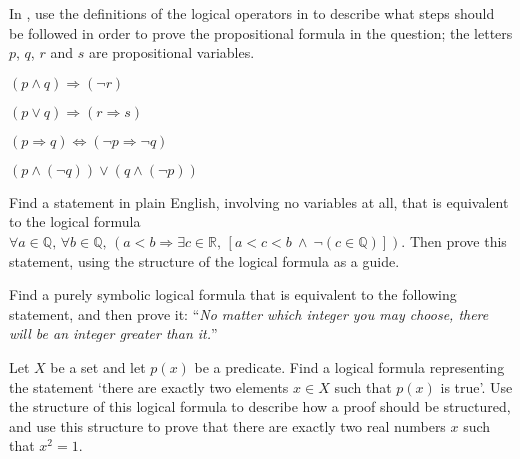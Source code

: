 In , use the definitions of the logical operators in  to describe what steps should be followed in order to prove the propositional formula in the question; the letters $p$, $q$, $r$ and $s$ are propositional variables.

\begin{chapex}
\label{cqStructureProofBegin}
$(p \wedge q) \Rightarrow (\neg r)$
\end{chapex}

\begin{chapex}
$(p \vee q) \Rightarrow (r \Rightarrow s)$
\end{chapex}

\begin{chapex}
$(p \Rightarrow q) \Leftrightarrow (\neg p \Rightarrow \neg q)$
\end{chapex}

\begin{chapex}
\label{cqStructureProofEnd}
$(p \wedge (\neg q)) \vee (q \wedge (\neg p))$
\end{chapex}


\begin{chapex}
Find a statement in plain English, involving no variables at all, that is equivalent to the logical formula $\forall a \in \mathbb{Q},\, \forall b \in \mathbb{Q},\, (a < b \Rightarrow \exists c \in \mathbb{R},\, [a < c < b ~\wedge~ \neg (c \in \mathbb{Q})])$. Then prove this statement, using the structure of the logical formula as a guide.
\end{chapex}

\begin{chapex}
Find a purely symbolic logical formula that is equivalent to the following statement, and then prove it: ``\textit{No matter which integer you may choose, there will be an integer greater than it.}''
\end{chapex}

\begin{chapex}
Let $X$ be a set and let $p(x)$ be a predicate. Find a logical formula representing the statement `there are exactly two elements $x \in X$ such that $p(x)$ is true'. Use the structure of this logical formula to describe how a proof should be structured, and use this structure to prove that there are exactly two real numbers $x$ such that $x^2=1$.
\end{chapex}


